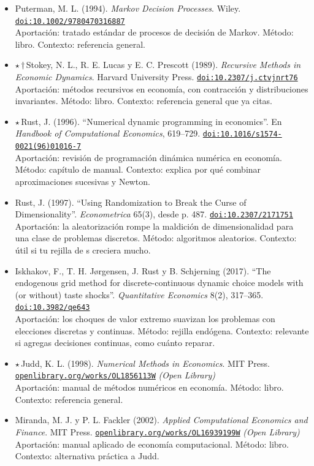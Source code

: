 \documentclass[11pt]{article}
\begin{document}
\begin{itemize}
\item Puterman, M. L. (1994). \textit{Markov Decision Processes}. Wiley. \href{https://doi.org/10.1002/9780470316887}{\texttt{doi:10.1002/9780470316887}}\\
Aportación: tratado estándar de procesos de decisión de Markov. Método: libro. Contexto: referencia general.
\item $\star$\,$\dagger$\,Stokey, N. L., R. E. Lucas y E. C. Prescott (1989). \textit{Recursive Methods in Economic Dynamics}. Harvard University Press. \href{https://doi.org/10.2307/j.ctvjnrt76}{\texttt{doi:10.2307/j.ctvjnrt76}}\\
Aportación: métodos recursivos en economía, con contracción y distribuciones invariantes. Método: libro. Contexto: referencia general que ya citas.
\item $\star$\,Rust, J. (1996). ``Numerical dynamic programming in economics''. En \textit{Handbook of Computational Economics}, 619--729. \href{https://doi.org/10.1016/s1574-0021(96)01016-7}{\texttt{doi:10.1016/s1574-0021(96)01016-7}}\\
Aportación: revisión de programación dinámica numérica en economía. Método: capítulo de manual. Contexto: explica por qué combinar aproximaciones sucesivas y Newton.
\item Rust, J. (1997). ``Using Randomization to Break the Curse of Dimensionality''. \textit{Econometrica} 65(3), desde p. 487. \href{https://doi.org/10.2307/2171751}{\texttt{doi:10.2307/2171751}}\\
Aportación: la aleatorización rompe la maldición de dimensionalidad para una clase de problemas discretos. Método: algoritmos aleatorios. Contexto: útil si tu rejilla de s creciera mucho.
\item Iskhakov, F., T. H. Jørgensen, J. Rust y B. Schjerning (2017). ``The endogenous grid method for discrete-continuous dynamic choice models with (or without) taste shocks''. \textit{Quantitative Economics} 8(2), 317--365. \href{https://doi.org/10.3982/qe643}{\texttt{doi:10.3982/qe643}}\\
Aportación: los choques de valor extremo suavizan los problemas con elecciones discretas y continuas. Método: rejilla endógena. Contexto: relevante si agregas decisiones continuas, como cuánto reparar.
\item $\star$\,Judd, K. L. (1998). \textit{Numerical Methods in Economics}. MIT Press. \href{https://openlibrary.org/works/OL1856113W}{\texttt{openlibrary.org/works/OL1856113W}} \textit{(Open Library)}\\
Aportación: manual de métodos numéricos en economía. Método: libro. Contexto: referencia general.
\item Miranda, M. J. y P. L. Fackler (2002). \textit{Applied Computational Economics and Finance}. MIT Press. \href{https://openlibrary.org/works/OL16939199W}{\texttt{openlibrary.org/works/OL16939199W}} \textit{(Open Library)}\\
Aportación: manual aplicado de economía computacional. Método: libro. Contexto: alternativa práctica a Judd.
\end{itemize}
\end{document}
